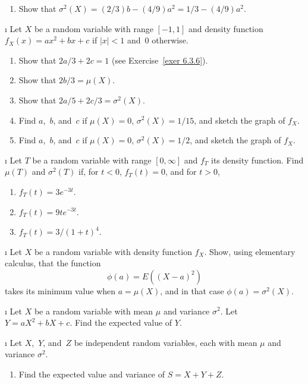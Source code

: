 {\begin{LJSItem}
\begin{enumerate}
\item Show that $\sigma^2(X) = (2/3)b - (4/9)a^2 = 1/3 - (4/9)a^2$.
\end{enumerate}

\i\label{exer 6.3.7} Let $X$ be a random variable with range $[-1,1]$ and density
function
$f_X(x) = ax^2 + bx + c$ if $|x| < 1$ and~0 otherwise.

\begin{enumerate}
\item Show that $2a/3 + 2c = 1$ (see Exercise~\ref{exer 6.3.6}).

\item Show that $2b/3 = \mu(X)$.

\item Show that $2a/5 + 2c/3 = \sigma^2(X)$.

\item Find $a$,~$b$, and~$c$ if $\mu(X) = 0$, $\sigma^2(X) = 1/15$, and sketch the
graph of $f_X$.

\item Find $a$,~$b$, and~$c$ if $\mu(X) = 0$, $\sigma^2(X) = 1/2$, and sketch the
graph of $f_X$.
\end{enumerate}

\i\label{exer 6.3.8} Let $T$ be a random variable with range $[0,\infty]$ and
$f_T$ its density function.  Find $\mu(T)$ and $\sigma^2(T)$ if, for $t < 0$, $f_T(t)
= 0$, and for $t > 0$,
\begin{enumerate}

\item $f_T(t) = 3e^{-3t}$.

\item $f_T(t) = 9te^{-3t}$.

\item $f_T(t) = 3/(1 + t)^4$.
\end{enumerate}

\i\label{exer 6.3.9} Let $X$ be a random variable with density function $f_X$. 
Show, using elementary calculus, that the function
$$
\phi(a) = E((X - a)^2)
$$ takes its minimum value when $a = \mu(X)$, and in that case $\phi(a) =
\sigma^2(X)$.

\i\label{exer 6.3.10} Let $X$ be a random variable with mean $\mu$ and variance
$\sigma^2$.  Let $Y = aX^2 + bX + c$.  Find the expected value of $Y$.

\i\label{exer 6.3.11} Let $X$,~$Y$, and~$Z$ be independent random variables, each
with mean
$\mu$ and variance $\sigma^2$.

\begin{enumerate}
\item Find the expected value and variance of $S = X + Y + Z$.


\end{enumerate}
\end{LJSItem}}
